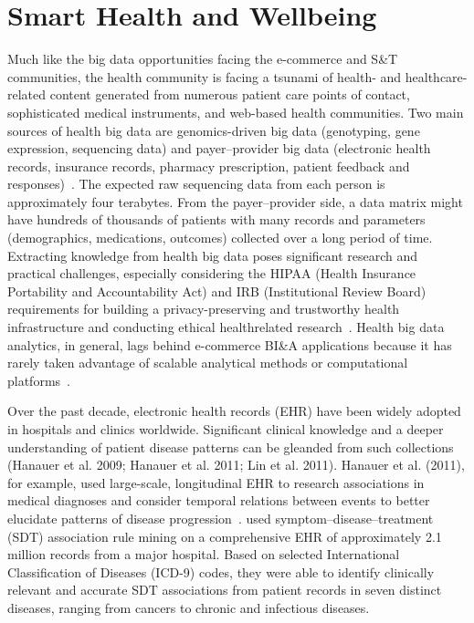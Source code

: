 \section*{Smart Health and Wellbeing}
Much like the big data opportunities facing the e-commerce
and S\&T communities, the health community is facing a
tsunami of health- and healthcare-related content generated
from numerous patient care points of contact, sophisticated
medical instruments, and web-based health communities.
Two main sources of health big data are genomics-driven big
data (genotyping, gene expression, sequencing data) and
payer–provider big data (electronic health records, insurance
records, pharmacy prescription, patient feedback and
responses)~\cite{Miller:2012a}. The expected raw sequencing data
from each person is approximately four terabytes. From the
payer–provider side, a data matrix might have hundreds of
thousands of patients with many records and parameters
(demographics, medications, outcomes) collected over a long
period of time. Extracting knowledge from health big data
poses significant research and practical challenges, especially
considering the HIPAA (Health Insurance Portability and
Accountability Act) and IRB (Institutional Review Board)
requirements for building a privacy-preserving and trustworthy
health infrastructure and conducting ethical healthrelated
research~\cite{Gelfand:2012}. Health big data analytics,
in general, lags behind e-commerce BI\&A applications
because it has rarely taken advantage of scalable analytical
methods or computational platforms~\cite{Miller:2012a}.

Over the past decade, electronic health records (EHR) have
been widely adopted in hospitals and clinics worldwide.
Significant clinical knowledge and a deeper understanding of
patient disease patterns can be gleanded from such collections
(Hanauer et al. 2009; Hanauer et al. 2011; Lin et al. 2011).
Hanauer et al. (2011), for example, used large-scale, longitudinal
EHR to research associations in medical diagnoses
and consider temporal relations between events to better
elucidate patterns of disease progression~\cite{Lin:2011}.
used symptom–disease–treatment (SDT) association rule
mining on a comprehensive EHR of approximately 2.1
million records from a major hospital. Based on selected
International Classification of Diseases (ICD-9) codes, they
were able to identify clinically relevant and accurate SDT
associations from patient records in seven distinct diseases,
ranging from cancers to chronic and infectious diseases.

